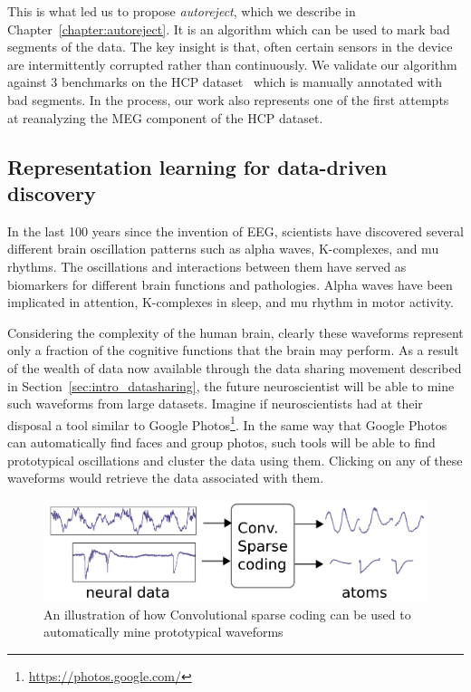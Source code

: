 This is what led us to propose \emph{autoreject}, which we describe in Chapter~\ref{chapter:autoreject}. It is an algorithm which can be used to mark bad segments of the data. The key insight is that, often certain sensors in the device are intermittently corrupted rather than continuously. We validate our algorithm against 3 benchmarks on the \ac{HCP} dataset~\citep{larson2013adding} which is manually annotated with bad segments. In the process, our work also represents one of the first attempts at reanalyzing the MEG component of the HCP dataset.

\subsection{Representation learning for data-driven discovery}
In the last 100 years since the invention of \ac{EEG}, scientists have discovered several different brain oscillation patterns such as alpha waves, K-complexes, and mu rhythms. The oscillations and interactions between them have served as biomarkers for different brain functions and pathologies. Alpha waves have been implicated in attention, K-complexes in sleep, and mu rhythm in motor activity. 

Considering the complexity of the human brain, clearly these waveforms represent only a fraction of the cognitive functions that the brain may perform. As a result of the wealth of data now available through the data sharing movement described in Section~\ref{sec:intro_datasharing}, the future neuroscientist will be able to mine such waveforms from large datasets. Imagine if neuroscientists had at their disposal a tool similar to Google Photos\footnote{\url{https://photos.google.com/}}. In the same way that Google Photos can automatically find faces and group photos, such tools will be able to find prototypical oscillations and cluster the data using them. Clicking on any of these waveforms would retrieve the data associated with them.

\begin{figure}[htb]
\begin{center}
   \includegraphics[width=0.7\linewidth]{figures/schema.pdf}
\end{center}
   \caption[Convolutional sparse coding]{An illustration of how Convolutional sparse coding can be used to automatically mine prototypical waveforms}
   \label{fig:neuroimaging_methods}
\end{figure}

